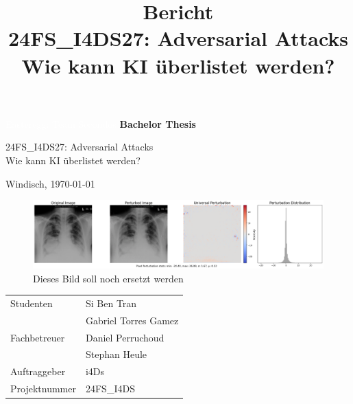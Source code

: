 \title{\textbf{Bericht}\break \\ 24FS\_I4DS27: Adversarial Attacks \\ Wie kann KI überlistet werden?} %

\begin{titlepage}
    \textcolor{white}{Easteregg: Team Secondos}
    \vfill
    \centering
    \vspace{0.5cm}
    \huge{\textbf{Bachelor Thesis}}
    
    \vspace{0.5cm}
    \huge{24FS\_I4DS27: Adversarial Attacks \\ Wie kann KI überlistet werden?}
    \vspace{0.5cm}
    
    \Large{Windisch, \germandate\today}      

    \vfill

    \begin{figure}[H]
        \centering
        \includegraphics[width=\columnwidth]{01-images/01-setup/01-titleimage.png}
        \caption{Dieses Bild soll noch ersetzt werden}
        \label{fig:01-titleimage}
    \end{figure}
    
    \vfill

    \large{
    \begin{tabular}{@{}p{7cm}l}
        Studenten                  &    Si Ben Tran\\
                                   &    Gabriel Torres Gamez\\[2ex]
        
        Fachbetreuer               &    Daniel Perruchoud\\
                                   &    Stephan Heule\\[2ex]
                                   
        Auftraggeber               &    i4Ds\\
        Projektnummer              &    24FS\_I4DS\\[4ex]
        

\end{tabular}}
\end{titlepage}
